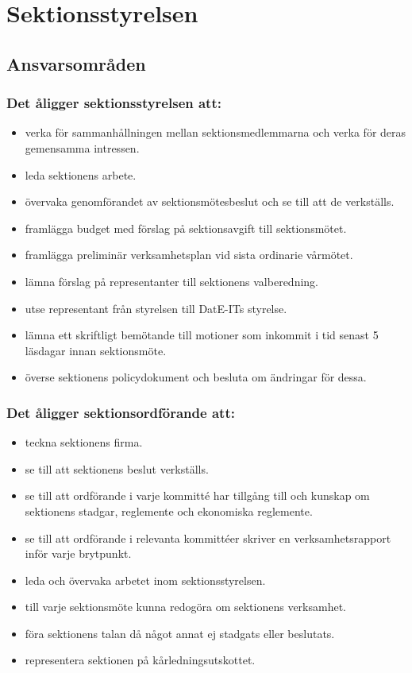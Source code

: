 \section{Sektionsstyrelsen}

\subsection{Ansvarsområden}

\subsubsection{Det åligger sektionsstyrelsen att:}

\begin{itemize}
  \item verka för sammanhållningen mellan sektionsmedlemmarna och verka för deras gemensamma intressen.
  \item leda sektionens arbete.
  \item övervaka genomförandet av sektionsmötesbeslut och se till att de verkställs.
  \item framlägga budget med förslag på sektionsavgift till sektionsmötet.
  \item framlägga preliminär verksamhetsplan vid sista ordinarie vårmötet.
  \item lämna förslag på representanter till sektionens valberedning.
  \item utse representant från styrelsen till DatE-ITs styrelse.
  \item lämna ett skriftligt bemötande till motioner som inkommit i tid senast 5 läsdagar innan sektionsmöte.
  \item överse sektionens policydokument och besluta om ändringar för dessa.
\end{itemize}

\subsubsection{Det åligger sektionsordförande att:} 

\begin{itemize}
  \item teckna sektionens firma.
  \item se till att sektionens beslut verkställs.
  \item se till att ordförande i varje kommitté har tillgång till och kunskap om sektionens stadgar, reglemente och ekonomiska reglemente.
  \item se till att ordförande i relevanta kommittéer skriver en verksamhetsrapport inför varje brytpunkt.
  \item leda och övervaka arbetet inom sektionsstyrelsen.
  \item till varje sektionsmöte kunna redogöra om sektionens verksamhet.
  \item föra sektionens talan då något annat ej stadgats eller beslutats.
  \item representera sektionen på kårledningsutskottet.
\end{itemize}

